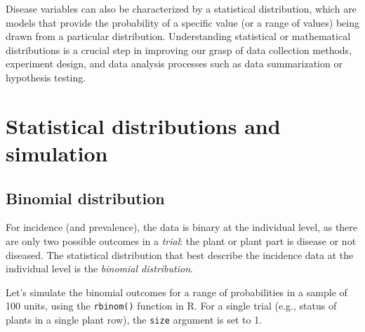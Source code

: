 \documentclass[
  letterpaper,
  DIV=11,
  numbers=noendperiod]{scrreprt}
\begin{document}
Disease variables can also be characterized by a statistical
distribution, which are models that provide the probability of a
specific value (or a range of values) being drawn from a particular
distribution. Understanding statistical or mathematical distributions is
a crucial step in improving our grasp of data collection methods,
experiment design, and data analysis processes such as data
summarization or hypothesis testing.

\hypertarget{statistical-distributions-and-simulation}{%
\section{Statistical distributions and
simulation}\label{statistical-distributions-and-simulation}}

\hypertarget{binomial-distribution}{%
\subsection{Binomial distribution}\label{binomial-distribution}}

For incidence (and prevalence), the data is binary at the individual
level, as there are only two possible outcomes in a \emph{trial}: the
plant or plant part is disease or not diseased. The statistical
distribution that best describe the incidence data at the individual
level is the \emph{binomial distribution}.

Let's simulate the binomial outcomes for a range of probabilities in a
sample of 100 units, using the \texttt{rbinom()} function in R. For a
single trial (e.g., status of plants in a single plant row), the
\texttt{size} argument is set to 1.
\end{document}

